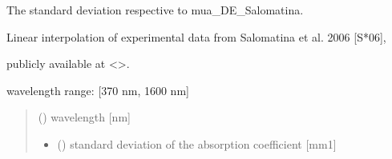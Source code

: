 \documentclass[letterpaper,10pt,english]{sphinxmanual}
\begin{document}
\begin{fulllineitems}
\label{\detokenize{03_absorption_coefficient:skinoptics.absorption_coefficient.std_mua_DE_Salomatina}}
\pysigstartsignatures
{}
\pysigstopsignatures
\begin{DUlineblock}{0em}
\item[] The standard deviation respective to mua\_DE\_Salomatina.
\item[] Linear interpolation of experimental data from Salomatina et al. 2006 {[}S*06{]},
\item[] publicly available at \textless{}\textgreater{}.
\end{DUlineblock}

\begin{DUlineblock}{0em}
\item[] wavelength range: {[}370 nm, 1600 nm{]}
\end{DUlineblock}
\begin{quote}\begin{description}
\sphinxAtStartPar
{} () \textendash{} wavelength {[}nm{]}

\sphinxAtStartPar
\begin{itemize}
\item {} 
\sphinxAtStartPar
{} () \textendash{} standard deviation of the absorption coefficient {[}mm\sphinxhyphen{}1{]}

\end{itemize}


\end{description}\end{quote}

\end{fulllineitems}

\end{document}
